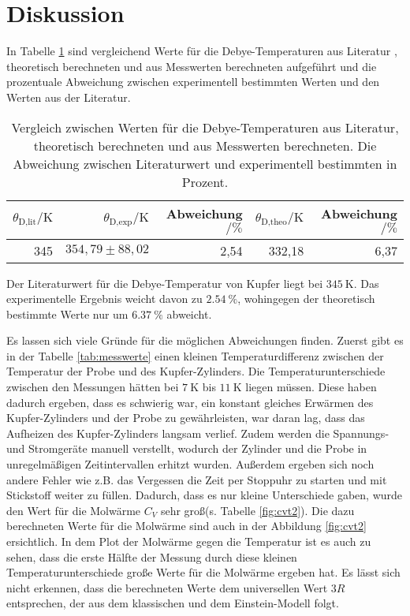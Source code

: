 \section{Diskussion}
\label{sec:Diskussion}
In Tabelle \ref{tab:exptheo} sind vergleichend Werte für die Debye-Temperaturen aus Literatur \cite{DebyeTemperaturKupfer}, theoretisch berechneten und aus Messwerten berechneten aufgeführt und die prozentuale Abweichung zwischen experimentell bestimmten Werten und den Werten aus der Literatur.

\begin{table}[htpb]
	\centering
	\caption{Vergleich zwischen Werten für die Debye-Temperaturen aus Literatur, theoretisch berechneten und aus Messwerten berechneten. Die Abweichung zwischen Literaturwert und experimentell bestimmten in Prozent.}
	\label{tab:exptheo}
	\begin{tabular}{rrrrr}
		\toprule
		$\theta_\text{D,lit}/\si{\kelvin}$ & $\theta_\text{D,exp}/\si{\kelvin}$ & Abweichung $/\si{\percent}$ & $\theta_\text{D,theo}/\si{\kelvin}$ & Abweichung $/\si{\percent}$ \\
		\hline
		345 & $354,79 \pm 88,02$ & 2,54 & 332,18 & 6,37 \\
		\bottomrule
	\end{tabular}
\end{table}

Der Literaturwert für die Debye-Temperatur von Kupfer liegt bei $\SI{345}{\kelvin}$. Das experimentelle Ergebnis weicht davon zu $\SI{2,54}{\percent}$, wohingegen der theoretisch bestimmte Werte nur um $\SI{6,37}{\percent}$ abweicht. 

Es lassen sich viele Gründe für die möglichen Abweichungen finden. Zuerst gibt es in der Tabelle \ref{tab:messwerte} einen kleinen Temperaturdifferenz zwischen der Temperatur der Probe und des Kupfer-Zylinders. Die Temperaturunterschiede zwischen den Messungen hätten bei $\SI{7}{\kelvin}$ bis $\SI{11}{\kelvin}$ liegen müssen. Diese haben dadurch ergeben, dass es schwierig war, ein konstant gleiches Erwärmen des Kupfer-Zylinders und der Probe zu gewährleisten, war daran lag, dass das Aufheizen des Kupfer-Zylinders langsam verlief. Zudem werden die Spannungs- und Stromgeräte manuell verstellt, wodurch der Zylinder und die Probe in unregelmäßigen Zeitintervallen erhitzt wurden. Außerdem ergeben sich noch andere Fehler wie z.B. das Vergessen die Zeit per Stoppuhr zu starten und mit Stickstoff weiter zu füllen. Dadurch, dass es nur kleine Unterschiede gaben, wurde den Wert für die Molwärme $C_V$ sehr groß(s. Tabelle \ref{fig:cvt2}). Die dazu berechneten Werte für die Molwärme sind auch in der Abbildung \ref{fig:cvt2} ersichtlich. In dem Plot der Molwärme gegen die Temperatur ist es auch zu sehen, dass die erste Hälfte der Messung durch diese kleinen Temperaturunterschiede große Werte für die Molwärme ergeben hat. Es lässt sich nicht erkennen, dass die berechneten Werte dem universellen Wert $3R$ entsprechen, der aus dem klassischen und dem Einstein-Modell folgt. 

